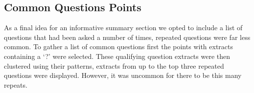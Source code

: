     \subsection{Common Questions Points}
      As a final idea for an informative summary section we opted to include a list of questions that had been asked a number of times, repeated questions were far less common. To gather a list of common questions first the points with extracts containing a `?' were selected. These qualifying question extracts were then clustered using their patterns, extracts from up to the top three repeated questions were displayed. However, it was uncommon for there to be this many repeats.
